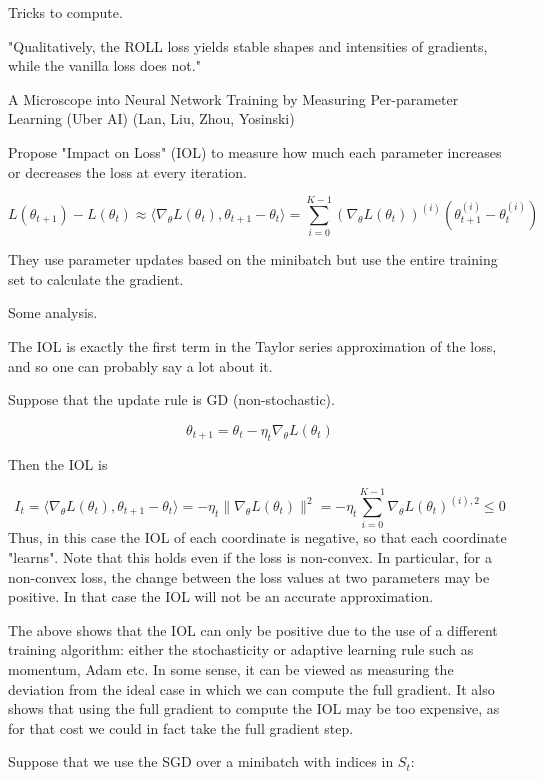 \documentclass[english]{article}
\begin{document}
Tricks to compute. 

"Qualitatively, the ROLL loss yields stable shapes
and intensities of gradients, while the vanilla loss does not."


\item A Microscope into Neural Network
Training by Measuring Per-parameter Learning (Uber AI) (Lan, Liu, Zhou, Yosinski)

Propose "Impact on
Loss" (IOL) to measure how much each
parameter increases or decreases the loss at
every iteration.

$$L(\theta_{t+1} ) - L(\theta_{t} ) \approx 
\langle\nabla_\theta L(\theta_{t} ), \theta_{t+1} - \theta_{t} 
\rangle
=
\sum_{i=0}^{K-1}
(\nabla_\theta L(\theta_{t} ))^{(i)} (\theta
^{(i)}_{t+1}
- \theta^{(i)}_t)
$$

They use parameter updates based on the minibatch but use the entire training set to
calculate the gradient.


Some analysis.

The IOL is exactly the first term in the Taylor series approximation of the loss, and so one can probably say a lot about it. 

Suppose that the update rule is GD (non-stochastic). 

$$\theta_{t+1} = \theta_{t} - \eta_t \nabla_\theta L(\theta_{t})$$

Then the IOL is 

$$I_t = 
\langle\nabla_\theta L(\theta_{t} ), \theta_{t+1} - \theta_{t} 
\rangle
=
- \eta_t 
\|\nabla_\theta L(\theta_{t} )\|^2
=
- \eta_t\sum_{i=0}^{K-1}
\nabla_\theta L(\theta_{t} )^{(i),2}\le 0
$$
Thus, in this case the IOL of each coordinate is negative, so that each coordinate "learns". Note that this holds even if the loss is non-convex. In particular, for a non-convex loss, the change between the loss values at two parameters may be positive. In that case the IOL will not be an accurate approximation.

The above shows that the IOL can only be positive due to the use of a different training algorithm: either the stochasticity or adaptive learning rule such as momentum, Adam etc. In some sense, it can be viewed as measuring the deviation from the ideal case in which we can compute the full gradient. It also shows that using the full gradient to compute the IOL may be too expensive, as for that cost we could in fact take the full gradient step. 


Suppose that we use the SGD over a minibatch with indices in $S_t$: 
\end{document}
